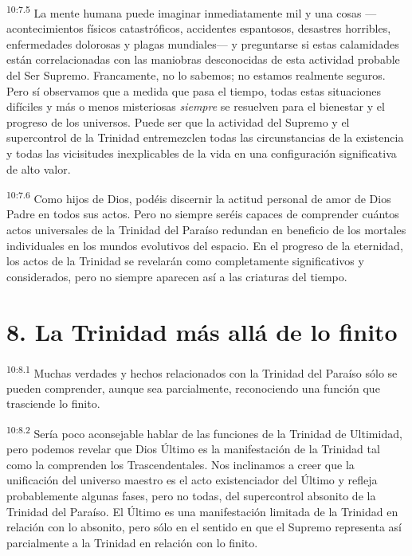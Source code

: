 \par
\textsuperscript{10:7.5} La mente humana puede imaginar inmediatamente mil y una cosas ---acontecimientos físicos catastróficos, accidentes espantosos, desastres horribles, enfermedades dolorosas y plagas mundiales--- y preguntarse si estas calamidades están correlacionadas con las maniobras desconocidas de esta actividad probable del Ser Supremo. Francamente, no lo sabemos; no estamos realmente seguros. Pero sí observamos que a medida que pasa el tiempo, todas estas situaciones difíciles y más o menos misteriosas \textit{siempre} se resuelven para el bienestar y el progreso de los universos. Puede ser que la actividad del Supremo y el supercontrol de la Trinidad entremezclen todas las circunstancias de la existencia y todas las vicisitudes inexplicables de la vida en una configuración significativa de alto valor.

\par
\textsuperscript{10:7.6} Como hijos de Dios, podéis discernir la actitud personal de amor de Dios Padre en todos sus actos. Pero no siempre seréis capaces de comprender cuántos actos universales de la Trinidad del Paraíso redundan en beneficio de los mortales individuales en los mundos evolutivos del espacio. En el progreso de la eternidad, los actos de la Trinidad se revelarán como completamente significativos y considerados, pero no siempre aparecen así a las criaturas del tiempo.

\section*{8. La Trinidad más allá de lo finito}
\par
\textsuperscript{10:8.1} Muchas verdades y hechos relacionados con la Trinidad del Paraíso sólo se pueden comprender, aunque sea parcialmente, reconociendo una función que trasciende lo finito.

\par
\textsuperscript{10:8.2} Sería poco aconsejable hablar de las funciones de la Trinidad de Ultimidad, pero podemos revelar que Dios Último es la manifestación de la Trinidad tal como la comprenden los Trascendentales. Nos inclinamos a creer que la unificación del universo maestro es el acto existenciador del Último y refleja probablemente algunas fases, pero no todas, del supercontrol absonito de la Trinidad del Paraíso. El
Último es una manifestación limitada de la Trinidad en relación con lo absonito, pero sólo en el sentido en que el Supremo representa así parcialmente a la Trinidad en relación con lo finito.


